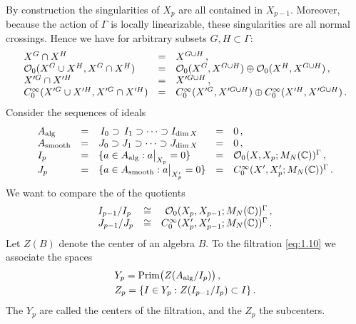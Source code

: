 By construction the singularities of $X_p$
are all contained in $X_{p-1}$. Moreover, because the action of $\Gamma$
is locally linearizable, these singularities are all normal crossings.
Hence we have for arbitrary subsets $G,H \subset \Gamma $:
\begin{equation}\label{eq:1.9}
\begin{array}{lll}
X^G \cap X^H & = & X^{G \cup H} \,, \\
\mathcal O_0 (X^G \cup X^H , X^G \cap X^H ) & = &
\mathcal O_0 (X^G , X^{G \cup H}) \oplus \mathcal O_0 (X^H , X^{G \cup H}) \,, \\
X'^G \cap X'^H & = & X'^{G \cup H} \,, \\
C^\infty_0 (X'^G \cup X'^H , X'^G \cap X'^H ) & = &
C^\infty_0 (X'^G , X'^{G \cup H}) \oplus C^\infty_0 (X'^H , X'^{G \cup H}) \,.
\end{array}
\end{equation}
Consider the sequences of ideals
\begin{equation}\label{eq:1.10}
\begin{array}{lllll}
A_\mathrm{alg} & = & \, I_0 \supset \, I_1 \supset \cdots \supset I_{\dim X} & = & 0 \,, \\
A_\mathrm{smooth} & = & J_0 \supset J_1 \supset \cdots \supset J_{\dim X} & = & 0 \,, \\
I_p & = & \{ a \in A_\mathrm{alg} : a \big|_{X_p} = 0 \} & = &
\mathcal O_0 (X,X_p ;M_N (\mathbb C ))^\Gamma \,, \\
J_p & = & \{ a \in A_\mathrm{smooth} : a \big|_{X'_p} = 0 \} & = &
C^\infty_0 (X',X'_p ;M_N (\mathbb C ))^\Gamma \,.
\end{array}
\end{equation}
We want to compare the \pch of the quotients
\[
\begin{array}{llr}
I_{p-1}/I_p & \cong & \mathcal O_0 (X_p ,X_{p-1} ;M_N (\mathbb C ))^\Gamma \,, \\
J_{p-1}/J_p & \cong & C^\infty_0 (X'_p ,X'_{p-1} ;M_N (\mathbb C ))^\Gamma \,.
\end{array}
\]
Let $Z (B)$ denote the center of an algebra $B$. To the filtration \eqref{eq:1.10}
we associate the spaces
\begin{equation}\label{eq:1.20}
\begin{aligned}
& Y_p = \mathrm{Prim}\big(Z (A_\mathrm{alg} / I_p )\big) \,,\\
& Z_p = \{ I \in Y_p : Z (I_{p-1}/I_p) \subset I \} \,.
\end{aligned}
\end{equation}
The $Y_p$ are called the centers of the filtration, and the $Z_p$ the subcenters.
